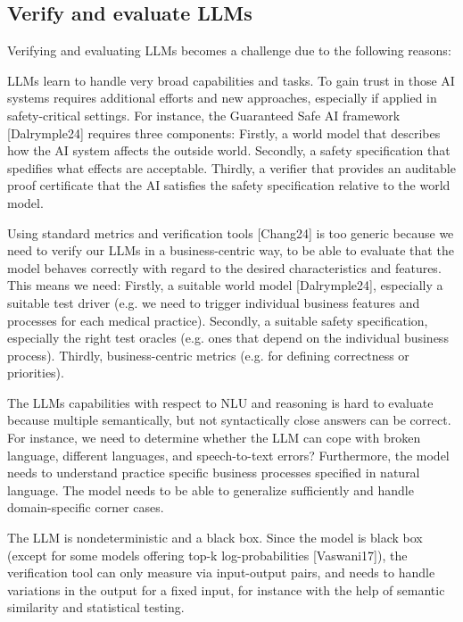 \documentclass[twocolumn]{article}
\begin{document}
\subsection{Verify and evaluate LLMs}
\label{sec:verifyandevaluatellms}

Verifying and evaluating LLMs becomes a challenge due to the following reasons:
\begin{compactitem}
\item LLMs learn to handle very broad capabilities and tasks. To gain trust in those AI systems requires additional efforts and new approaches, especially if applied in safety-critical settings. For instance, the Guaranteed Safe AI framework [Dalrymple24] requires three components: Firstly, a world model that describes how the AI system affects the outside world. Secondly, a safety specification that spedifies what effects are acceptable. Thirdly, a verifier that provides an auditable proof certificate that the AI satisfies the safety specification relative to the world model.
\item Using standard metrics and verification tools [Chang24] is too generic because we need to verify our LLMs in a business-centric way, to be able to evaluate that the model behaves correctly with regard to the desired characteristics and features.
  This means we need: Firstly, a suitable world model [Dalrymple24], especially a suitable test driver (e.g. we need to trigger individual business features and processes for each medical practice). Secondly, a suitable safety specification, especially the right test oracles (e.g. ones that depend on the individual business process). Thirdly, business-centric metrics (e.g. for defining correctness or priorities).
\item The LLMs capabilities with respect to NLU and reasoning is hard to evaluate because multiple semantically, but not syntactically close answers can be correct. For instance, we need to determine whether the LLM can cope with broken language, different languages, and speech-to-text errors? Furthermore, the model needs to understand practice specific business processes specified in natural language. The model needs to be able to generalize sufficiently and handle domain-specific corner cases.
\item The LLM is nondeterministic and a black box. Since the model is black box (except for some models offering top-k log-probabilities [Vaswani17]),
  the verification tool can only measure via input-output pairs, and needs to handle variations in the output for a fixed input,
  for instance with the help of semantic similarity and statistical testing.
\end{compactitem}
\end{document}
